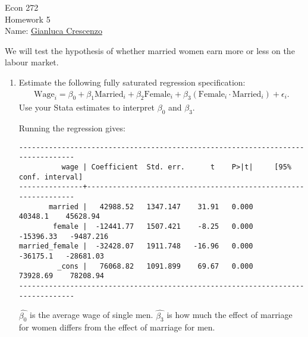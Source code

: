\documentclass[11pt,twoside,openany]{memoir}
\begin{document}
\begin{center}
{\large Econ 272 \\[0.1in]Homework 5 \\[0.1in]}
{Name:} {\underline{Gianluca Crescenzo\hspace*{2in}}}\\[0.15in]
\end{center}
\vspace{4pt}
\begin{question}
    We will test the hypothesis of whether married women earn more or less on the labour market.
    \begin{enumerate}[label = (\alph*),itemsep=1pt,topsep=3pt]
        \item Estimate the following fully saturated regression specification:
            \begin{equation*}
            \begin{split}
                \text{Wage}_i = \beta_0 + \beta_1 \text{Married}_i + \beta_2 \text{Female}_i + \beta_3 (\text{Female}_i\cdot \text{Married}_i) + \epsilon_i. 
            \end{split}
            \end{equation*}
        Use your Stata estimates to interpret $\beta_0$ and $\beta_3$.
            {\color{blue} \begin{solution}
                Running the regression gives:
                \begin{Verbatim}
--------------------------------------------------------------------------------
          wage | Coefficient  Std. err.      t    P>|t|     [95% conf. interval]
---------------+----------------------------------------------------------------
       married |   42988.52   1347.147    31.91   0.000      40348.1    45628.94
        female |  -12441.77   1507.421    -8.25   0.000    -15396.33   -9487.216
married_female |  -32428.07   1911.748   -16.96   0.000     -36175.1   -28681.03
         _cons |   76068.82   1091.899    69.67   0.000     73928.69    78208.94
--------------------------------------------------------------------------------                    
                \end{Verbatim}
                $\widehat{\beta_0}$ is the average wage of single men. $\widehat{\beta_3}$ is how much the effect of marriage for women differs from the effect of marriage for men.
            \end{solution}}


\end{enumerate}
\end{question}
\end{document}
